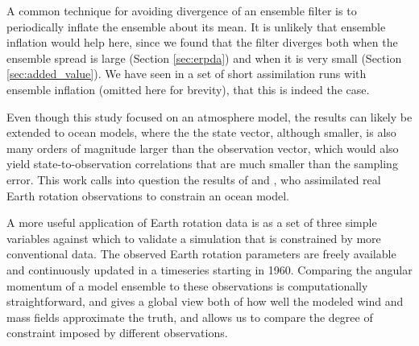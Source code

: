 A common technique for avoiding divergence of an ensemble filter is to periodically inflate the ensemble about its mean. 
It is unlikely that ensemble inflation would help here, since we found that the filter diverges both when the ensemble spread is large (Section \ref{sec:erpda}) and when it is very small (Section \ref{sec:added_value}). 
We have seen in a set of short assimilation runs with ensemble inflation (omitted here for brevity), that this is indeed the case. 


Even though this study focused on an atmosphere model, the results can likely be extended to ocean models, where the the state vector, although smaller, is also many orders of magnitude larger than the observation vector, which would also yield state-to-observation correlations that are much smaller than the sampling error. 
This work calls into question the results of \citet{Saynisch2010,Saynisch2011} and \citet{Saynisch2012}, who assimilated real Earth rotation observations to constrain an ocean model. 

A more useful application of Earth rotation data is as a set of three simple variables against which to validate a simulation that is constrained by more conventional data.  
The observed Earth rotation parameters are freely available \citep{iers} and continuously updated in a timeseries starting in 1960. 
Comparing the angular momentum of a model ensemble to these observations is computationally straightforward, and 
gives a global view both of how well the modeled wind and mass fields approximate the truth, and allows us to compare the degree of constraint imposed by different observations. 



